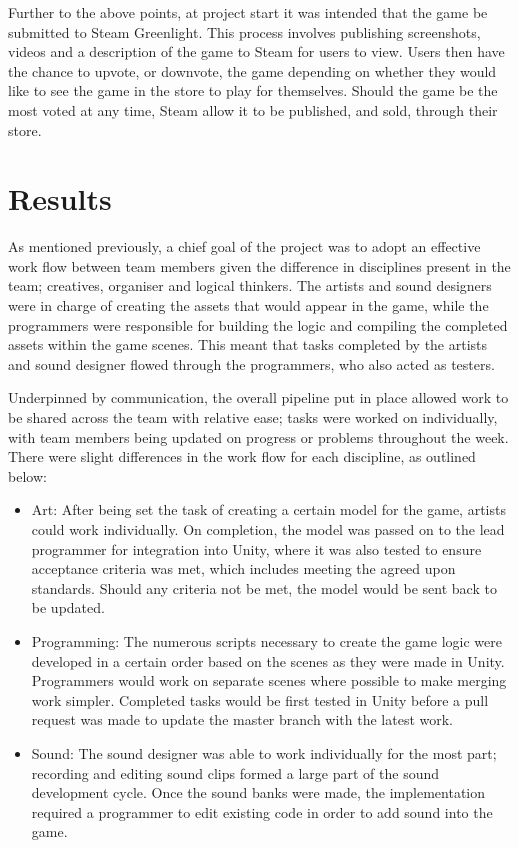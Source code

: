 \documentclass[12pt]{article}
\begin{document}
Further to the above points, at project start it was intended that the game be submitted to Steam Greenlight. This process involves publishing screenshots, videos and a description of the game to Steam for users to view. Users then have the chance to upvote, or downvote, the game depending on whether they would like to see the game in the store to play for themselves. Should the game be the most voted at any time, Steam allow it to be published, and sold, through their store. 

\section{Results}
As mentioned previously, a chief goal of the project was to adopt an effective work flow between team members given the difference in disciplines present in the team; creatives, organiser and logical thinkers. The artists and sound designers were in charge of creating the assets that would appear in the game, while the programmers were responsible for building the logic and compiling the completed assets within the game scenes. This meant that tasks completed by the artists and sound designer flowed through the programmers, who also acted as testers. 

Underpinned by communication, the overall pipeline put in place allowed work to be shared across the team with relative ease; tasks were worked on individually, with team members being updated on progress or problems throughout the week. There were slight differences in the work flow for each discipline, as outlined below: 
\begin{itemize}
	\item Art: After being set the task of creating a certain model for the game, artists could work individually. On completion, the model was passed on to the lead programmer for integration into Unity, where it was also tested to ensure acceptance criteria was met, which includes meeting the agreed upon standards. Should any criteria not be met, the model would be sent back to be updated. 
	\item Programming: The numerous scripts necessary to create the game logic were developed in a certain order based on the scenes as they were made in Unity. Programmers would work on separate scenes where possible to make merging work simpler. Completed tasks would be first tested in Unity before a pull request was made to update the master branch with the latest work. 
	\item Sound: The sound designer was able to work individually for the most part; recording and editing sound clips formed a large part of the sound development cycle. Once the sound banks were made, the implementation required a programmer to edit existing code in order to add sound into the game. 
\end{itemize}
\end{document}
